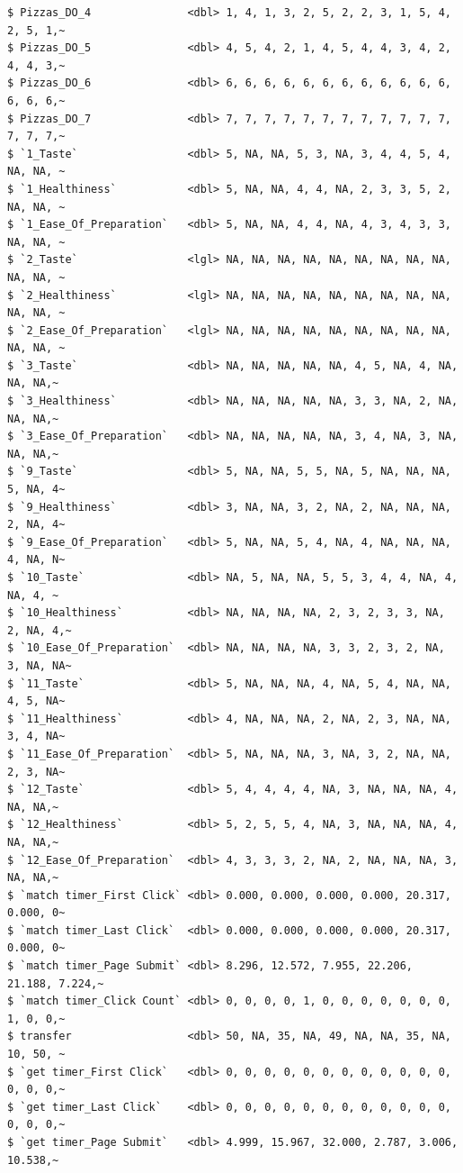 \documentclass[
  letterpaper,
]{book}
\begin{document}
\begin{verbatim}
$ Pizzas_DO_4               <dbl> 1, 4, 1, 3, 2, 5, 2, 2, 3, 1, 5, 4, 2, 5, 1,~
$ Pizzas_DO_5               <dbl> 4, 5, 4, 2, 1, 4, 5, 4, 4, 3, 4, 2, 4, 4, 3,~
$ Pizzas_DO_6               <dbl> 6, 6, 6, 6, 6, 6, 6, 6, 6, 6, 6, 6, 6, 6, 6,~
$ Pizzas_DO_7               <dbl> 7, 7, 7, 7, 7, 7, 7, 7, 7, 7, 7, 7, 7, 7, 7,~
$ `1_Taste`                 <dbl> 5, NA, NA, 5, 3, NA, 3, 4, 4, 5, 4, NA, NA, ~
$ `1_Healthiness`           <dbl> 5, NA, NA, 4, 4, NA, 2, 3, 3, 5, 2, NA, NA, ~
$ `1_Ease_Of_Preparation`   <dbl> 5, NA, NA, 4, 4, NA, 4, 3, 4, 3, 3, NA, NA, ~
$ `2_Taste`                 <lgl> NA, NA, NA, NA, NA, NA, NA, NA, NA, NA, NA, ~
$ `2_Healthiness`           <lgl> NA, NA, NA, NA, NA, NA, NA, NA, NA, NA, NA, ~
$ `2_Ease_Of_Preparation`   <lgl> NA, NA, NA, NA, NA, NA, NA, NA, NA, NA, NA, ~
$ `3_Taste`                 <dbl> NA, NA, NA, NA, NA, 4, 5, NA, 4, NA, NA, NA,~
$ `3_Healthiness`           <dbl> NA, NA, NA, NA, NA, 3, 3, NA, 2, NA, NA, NA,~
$ `3_Ease_Of_Preparation`   <dbl> NA, NA, NA, NA, NA, 3, 4, NA, 3, NA, NA, NA,~
$ `9_Taste`                 <dbl> 5, NA, NA, 5, 5, NA, 5, NA, NA, NA, 5, NA, 4~
$ `9_Healthiness`           <dbl> 3, NA, NA, 3, 2, NA, 2, NA, NA, NA, 2, NA, 4~
$ `9_Ease_Of_Preparation`   <dbl> 5, NA, NA, 5, 4, NA, 4, NA, NA, NA, 4, NA, N~
$ `10_Taste`                <dbl> NA, 5, NA, NA, 5, 5, 3, 4, 4, NA, 4, NA, 4, ~
$ `10_Healthiness`          <dbl> NA, NA, NA, NA, 2, 3, 2, 3, 3, NA, 2, NA, 4,~
$ `10_Ease_Of_Preparation`  <dbl> NA, NA, NA, NA, 3, 3, 2, 3, 2, NA, 3, NA, NA~
$ `11_Taste`                <dbl> 5, NA, NA, NA, 4, NA, 5, 4, NA, NA, 4, 5, NA~
$ `11_Healthiness`          <dbl> 4, NA, NA, NA, 2, NA, 2, 3, NA, NA, 3, 4, NA~
$ `11_Ease_Of_Preparation`  <dbl> 5, NA, NA, NA, 3, NA, 3, 2, NA, NA, 2, 3, NA~
$ `12_Taste`                <dbl> 5, 4, 4, 4, 4, NA, 3, NA, NA, NA, 4, NA, NA,~
$ `12_Healthiness`          <dbl> 5, 2, 5, 5, 4, NA, 3, NA, NA, NA, 4, NA, NA,~
$ `12_Ease_Of_Preparation`  <dbl> 4, 3, 3, 3, 2, NA, 2, NA, NA, NA, 3, NA, NA,~
$ `match timer_First Click` <dbl> 0.000, 0.000, 0.000, 0.000, 20.317, 0.000, 0~
$ `match timer_Last Click`  <dbl> 0.000, 0.000, 0.000, 0.000, 20.317, 0.000, 0~
$ `match timer_Page Submit` <dbl> 8.296, 12.572, 7.955, 22.206, 21.188, 7.224,~
$ `match timer_Click Count` <dbl> 0, 0, 0, 0, 1, 0, 0, 0, 0, 0, 0, 0, 1, 0, 0,~
$ transfer                  <dbl> 50, NA, 35, NA, 49, NA, NA, 35, NA, 10, 50, ~
$ `get timer_First Click`   <dbl> 0, 0, 0, 0, 0, 0, 0, 0, 0, 0, 0, 0, 0, 0, 0,~
$ `get timer_Last Click`    <dbl> 0, 0, 0, 0, 0, 0, 0, 0, 0, 0, 0, 0, 0, 0, 0,~
$ `get timer_Page Submit`   <dbl> 4.999, 15.967, 32.000, 2.787, 3.006, 10.538,~

\end{verbatim}
\end{document}
